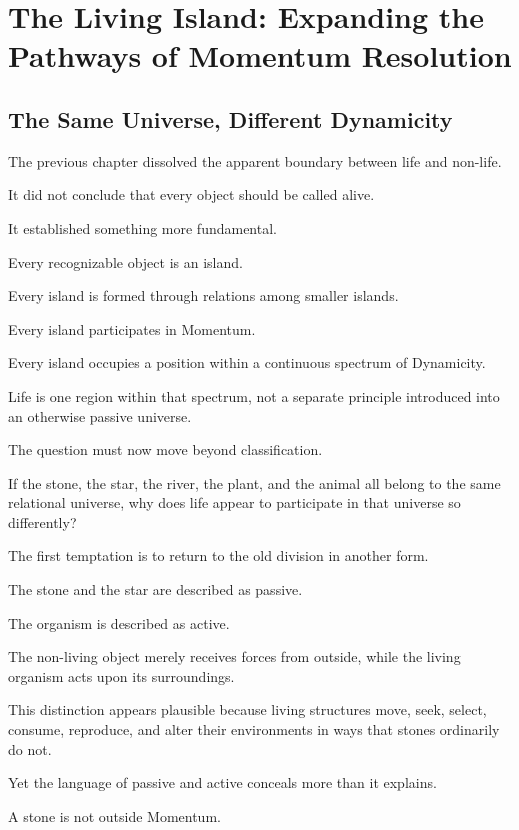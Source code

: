 

\section{The Living Island: Expanding the Pathways of Momentum Resolution}

\subsection*{\textbf{The Same Universe, Different Dynamicity}}


The previous chapter dissolved the apparent boundary between life and non-life.

It did not conclude that every object should be called alive.

It established something more fundamental.

Every recognizable object is an island.

Every island is formed through relations among smaller islands.

Every island participates in Momentum.

Every island occupies a position within a continuous spectrum of Dynamicity.

Life is one region within that spectrum, not a separate principle introduced into an otherwise passive universe.

The question must now move beyond classification.

If the stone, the star, the river, the plant, and the animal all belong to the same relational universe, why does life appear to participate in that universe so differently?

The first temptation is to return to the old division in another form.

The stone and the star are described as passive.

The organism is described as active.

The non-living object merely receives forces from outside, while the living organism acts upon its surroundings.

This distinction appears plausible because living structures move, seek, select, consume, reproduce, and alter their environments in ways that stones ordinarily do not.

Yet the language of passive and active conceals more than it explains.

A stone is not outside Momentum.

